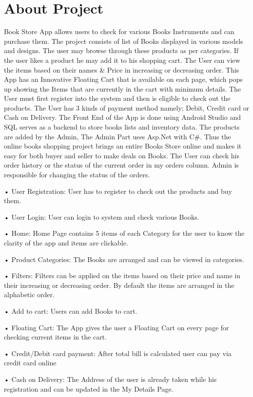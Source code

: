 \section{About Project}
Book Store App allows users to check for various Books Instruments and can purchase them. The project consists of list of Books displayed in various models and designs. The user may browse through these products as per categories. If the user likes a product he may add it to his shopping cart. The User can view the items based on their names & Price in increasing or decreasing order.
This App has an Innovative Floating Cart that is available on each page, which pops up showing the Items that are currently in the cart with minimum details. The User must first register into the system and then is eligible to check out the products. The User has 3 kinds of payment method namely; Debit, Credit card or Cash on Delivery. The Front End of the App is done using Android Studio and SQL serves as a backend to store books lists and inventory data. The products are added by the Admin, The Admin Part uses Asp.Net with C#. Thus the online books shopping project brings an entire Books Store online and makes it easy for both buyer and seller to make deals on Books. The User can check his order history or the status of the current order in my orders column. Admin is responsible for changing the status of the orders.


•	User Registration: User has to register to check out the products and buy them.

•	User Login: User can login to system and check various Books.

•	Home: Home Page contains 5 items of each Category for the user to know the clarity of the app and items are clickable. 

•	Product Categories: The Books are arranged and can be viewed in categories.

•	Filters: Filters can be applied on the items based on their price and name in their increasing or decreasing order. By default the items are arranged in the alphabetic order.

•	Add to cart: Users can add Books to cart.

•	Floating Cart: The App gives the user a Floating Cart on every page for checking current items in the cart.

•	Credit/Debit card payment: After total bill is calculated user can pay via credit card online

•	Cash on Delivery: The Address of the user is already taken while his registration and can be updated in the My Details Page.


